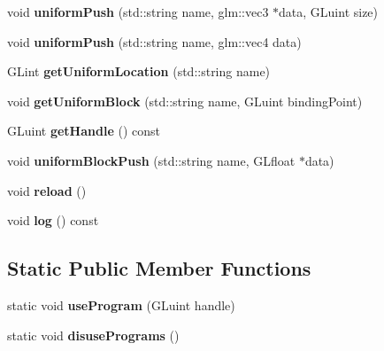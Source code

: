 \begin{DoxyCompactItemize}
\item 
void {\bfseries uniform\+Push} (std\+::string name, glm\+::vec3 $\ast$data, G\+Luint size)\hypertarget{classflw_1_1flc_1_1Program_ab52f0623dd1d3a973eb0862fdf06f48c}{}\label{classflw_1_1flc_1_1Program_ab52f0623dd1d3a973eb0862fdf06f48c}

\item 
void {\bfseries uniform\+Push} (std\+::string name, glm\+::vec4 data)\hypertarget{classflw_1_1flc_1_1Program_a1c21744e8d0787ffb59677f9e13d21a0}{}\label{classflw_1_1flc_1_1Program_a1c21744e8d0787ffb59677f9e13d21a0}

\item 
G\+Lint {\bfseries get\+Uniform\+Location} (std\+::string name)\hypertarget{classflw_1_1flc_1_1Program_a10e9c36fb125695989c0670174d6f985}{}\label{classflw_1_1flc_1_1Program_a10e9c36fb125695989c0670174d6f985}

\item 
void {\bfseries get\+Uniform\+Block} (std\+::string name, G\+Luint binding\+Point)\hypertarget{classflw_1_1flc_1_1Program_aa2ce8fe7bd5d4f0dbec3cb72c64e08fe}{}\label{classflw_1_1flc_1_1Program_aa2ce8fe7bd5d4f0dbec3cb72c64e08fe}

\item 
G\+Luint {\bfseries get\+Handle} () const \hypertarget{classflw_1_1flc_1_1Program_a8860dc2402cef6b5a79f1da7826630f1}{}\label{classflw_1_1flc_1_1Program_a8860dc2402cef6b5a79f1da7826630f1}

\item 
void {\bfseries uniform\+Block\+Push} (std\+::string name, G\+Lfloat $\ast$data)\hypertarget{classflw_1_1flc_1_1Program_a73e1d72031cd7b2a1cf7b5d1595cd921}{}\label{classflw_1_1flc_1_1Program_a73e1d72031cd7b2a1cf7b5d1595cd921}

\item 
void {\bfseries reload} ()\hypertarget{classflw_1_1flc_1_1Program_a76b6dc68fb09c934ebefd82ef645ad35}{}\label{classflw_1_1flc_1_1Program_a76b6dc68fb09c934ebefd82ef645ad35}

\item 
void {\bfseries log} () const \hypertarget{classflw_1_1flc_1_1Program_a7f6a25c827a057c5efe419d116533f7b}{}\label{classflw_1_1flc_1_1Program_a7f6a25c827a057c5efe419d116533f7b}

\end{DoxyCompactItemize}
\subsection*{Static Public Member Functions}
\begin{DoxyCompactItemize}
\item 
static void {\bfseries use\+Program} (G\+Luint handle)\hypertarget{classflw_1_1flc_1_1Program_a866a579bba8c15face6ce9051e1aa88b}{}\label{classflw_1_1flc_1_1Program_a866a579bba8c15face6ce9051e1aa88b}

\item 
static void {\bfseries disuse\+Programs} ()\hypertarget{classflw_1_1flc_1_1Program_a949005d6544d46d10cd56b6ef8955c81}{}\label{classflw_1_1flc_1_1Program_a949005d6544d46d10cd56b6ef8955c81}

\end{DoxyCompactItemize}


